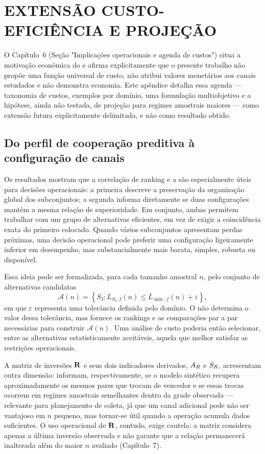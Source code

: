 \chapter{EXTENSÃO CUSTO-EFICIÊNCIA E PROJEÇÃO}
\label{ap:custos}

O Capítulo~6 (Seção "Implicações operacionais e agenda de custos") situa a motivação econômica do \CoInfoSim{} e afirma explicitamente que o presente trabalho não propõe uma função universal de custo, não atribui valores monetários aos canais estudados e não demonstra economia. Este apêndice detalha essa agenda --- taxonomia de custos, exemplos por domínio, uma formulação multiobjetivo e a hipótese, ainda não testada, de projeção para regimes amostrais maiores --- como extensão futura explicitamente delimitada, e não como resultado obtido.

\section{Do perfil de cooperação preditiva à configuração de canais}

Os resultados mostram que a correlação de ranking e a \WinnersAgreement{} são especialmente úteis para decisões operacionais: a primeira descreve a preservação da organização global dos subconjuntos; a segunda informa diretamente se duas configurações mantêm a mesma relação de superioridade. Em conjunto, ambas permitem trabalhar com um grupo de alternativas eficientes, em vez de exigir a coincidência exata do primeiro colocado. Quando vários subconjuntos apresentam perdas próximas, uma decisão operacional pode preferir uma configuração ligeiramente inferior em desempenho, mas substancialmente mais barata, simples, robusta ou disponível.

Essa ideia pode ser formalizada, para cada tamanho amostral $n$, pelo conjunto de alternativas candidatas
\[
\mathcal{A}(n)=\left\{S_I:\overline{L}_{S_I,f}(n)\leq
\overline{L}_{\min,f}(n)+\varepsilon\right\},
\]
em que $\varepsilon$ representa uma tolerância definida pelo domínio. O \CoInfoSim{} não determina o valor dessa tolerância, mas fornece os rankings e as comparações par a par necessárias para construir $\mathcal{A}(n)$. Uma análise de custo poderia então selecionar, entre as alternativas estatisticamente aceitáveis, aquela que melhor satisfaz as restrições operacionais.

A matriz de inversões $\mathbf{R}$ e seus dois indicadores derivados, $A_R$ e $S_R$, acrescentam outra dimensão: informam, respectivamente, se o modelo sintético recupera aproximadamente os mesmos pares que trocam de vencedor e se essas trocas ocorrem em regimes amostrais semelhantes dentro da grade observada --- relevante para planejamento de coleta, já que um canal adicional pode não ser vantajoso em $n$ pequeno, mas tornar-se útil quando a operação acumula dados suficientes. O uso operacional de $\mathbf{R}$, contudo, exige cautela: a matriz considera apenas a última inversão observada e não garante que a relação permanecerá inalterada além do maior $n$ avaliado (Capítulo~7).

